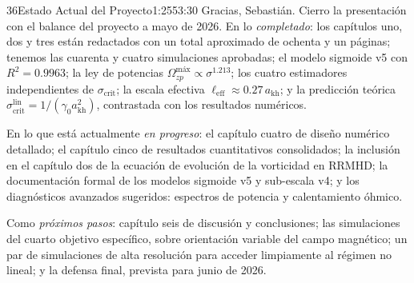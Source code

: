 \documentclass[11pt,a4paper]{article}
\begin{document}
\begin{bryorador}{36}{Estado Actual del Proyecto}{1:25}{53:30}
Gracias, Sebastián. Cierro la presentación con el balance del proyecto a mayo
de 2026. En lo \emph{completado}: los capítulos uno, dos y tres están
redactados con un total aproximado de ochenta y un páginas; tenemos las
cuarenta y cuatro simulaciones aprobadas; el modelo sigmoide v5 con
$R^2=0.9963$; la ley de potencias $\Omega^\text{máx}_{zp}\propto\sigma^{1.213}$;
los cuatro estimadores independientes de $\sigma_\text{crit}$; la escala
efectiva $\ell_\text{eff}\approx 0.27\,a_\text{kh}$; y la predicción teórica
$\sigma^\text{lin}_\text{crit}=1/(\gamma_0 a_\text{kh}^2)$, contrastada con
los resultados numéricos.

En lo que está actualmente \emph{en progreso}: el capítulo cuatro de diseño
numérico detallado; el capítulo cinco de resultados cuantitativos
consolidados; la inclusión en el capítulo dos de la ecuación de evolución de
la vorticidad en RRMHD; la documentación formal de los modelos sigmoide v5 y
sub-escala v4; y los diagnósticos avanzados sugeridos: espectros de potencia
y calentamiento óhmico.

Como \emph{próximos pasos}: capítulo seis de discusión y conclusiones; las
simulaciones del cuarto objetivo específico, sobre orientación variable del
campo magnético; un par de simulaciones de alta resolución para acceder
limpiamente al régimen no lineal; y la defensa final, prevista para junio
de 2026.
\end{bryorador}
\end{document}
